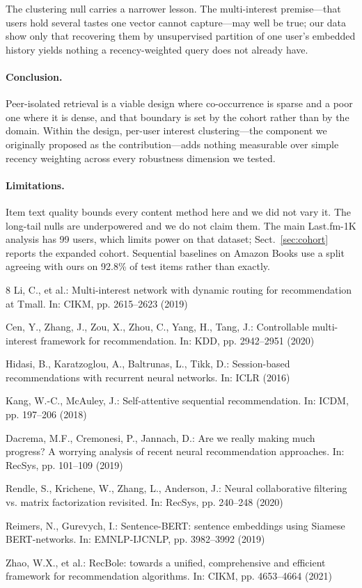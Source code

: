 \documentclass[runningheads]{llncs}
\begin{document}
The clustering null carries a narrower lesson. The multi-interest premise---that users hold
several tastes one vector cannot capture---may well be true; our data show only that
recovering them by unsupervised partition of one user's embedded history yields nothing a
recency-weighted query does not already have.

\paragraph{Conclusion.} Peer-isolated retrieval is a viable design where co-occurrence is
sparse and a poor one where it is dense, and that boundary is set by the cohort rather than
by the domain. Within the design, per-user interest clustering---the component we
originally proposed as the contribution---adds nothing measurable over simple recency
weighting across every robustness dimension we tested.

\paragraph{Limitations.} Item text quality bounds every content method here and we did not
vary it. The long-tail nulls are underpowered and we do not claim them. The main Last.fm-1K
analysis has 99 users, which limits power on that dataset; Sect.~\ref{sec:cohort} reports
the expanded cohort. Sequential baselines on Amazon Books use a split agreeing with ours on
92.8\% of test items rather than exactly.

\begin{thebibliography}{8}
Li, C., et al.: Multi-interest network with dynamic routing for recommendation at Tmall.
In: CIKM, pp. 2615--2623 (2019)

Cen, Y., Zhang, J., Zou, X., Zhou, C., Yang, H., Tang, J.: Controllable multi-interest
framework for recommendation. In: KDD, pp. 2942--2951 (2020)

Hidasi, B., Karatzoglou, A., Baltrunas, L., Tikk, D.: Session-based recommendations with
recurrent neural networks. In: ICLR (2016)

Kang, W.-C., McAuley, J.: Self-attentive sequential recommendation. In: ICDM,
pp. 197--206 (2018)

Dacrema, M.F., Cremonesi, P., Jannach, D.: Are we really making much progress? A worrying
analysis of recent neural recommendation approaches. In: RecSys, pp. 101--109 (2019)

Rendle, S., Krichene, W., Zhang, L., Anderson, J.: Neural collaborative filtering vs.
matrix factorization revisited. In: RecSys, pp. 240--248 (2020)

Reimers, N., Gurevych, I.: Sentence-BERT: sentence embeddings using Siamese BERT-networks.
In: EMNLP-IJCNLP, pp. 3982--3992 (2019)

Zhao, W.X., et al.: RecBole: towards a unified, comprehensive and efficient framework for
recommendation algorithms. In: CIKM, pp. 4653--4664 (2021)
\end{thebibliography}
\end{document}
